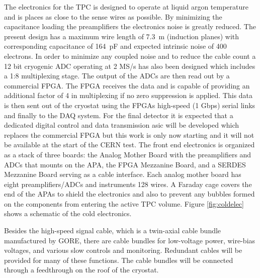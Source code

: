 The electronics for the TPC is designed to operate at liquid argon temperature and is places as close to the sense wires as possible. By minimizing the capacitance loading the preamplifiers the electronics noise is greatly reduced. The present design has a maximum wire length of 7.3~m (induction planes) with corresponding capacitance of 164~pF and expected intrinsic noise of 400 electrons. In order to minimize any coupled noise and to reduce the cable count a 12 bit cryogenic ADC operating at 2 MS/s has also been designed which includes a 1:8 multiplexing stage. The output of the ADCs are then read out by a commercial  FPGA. The FPGA receives the data and is capable of providing an additional factor of 4 in multiplexing if no zero suppression is applied.  This data is then sent out of the cryostat using the FPGAs high-speed (1 Gbps) serial links and finally to the DAQ system.  For the final detector it is expected that a dedicated digital control and data transmission asic will be developed which replaces the commercial FPGA but this work is only now starting and it will not be available at the start of the CERN test. The front end electronics is organized as a stack of three boards:  the Analog Mother Board with the preamplifiers and ADCs that mounts on the APA, the FPGA Mezzanine Board, and a SERDES Mezzanine Board serving as a cable interface.  Each analog mother board has eight preamplifiers/ADCs and instruments 128 wires. A Faraday cage covers the end of the APAs to shield the electronics and also to prevent any bubbles formed on the components from entering the active TPC volume. Figure \ref{fig:coldelec} shows a schematic of the cold electronics. 

Besides the high-speed signal cable, which is a twin-axial cable bundle manufactured by GORE, there are cable bundles for low-voltage power, wire-bias voltages, and various slow controls and monitoring. Redundant cables will be provided for many of these functions. The  cable bundles will be connected through a feedthrough on the roof of the cryostat. 


